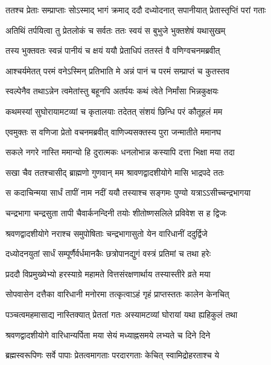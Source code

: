 \twolineshloka
{ततश्च प्रेताः सम्प्राप्ताः सोऽस्माद् भागं क्रमाद् ददौ}
{दध्योदनात् सपानीयात् प्रेतास्तृप्तिं परां गताः}%

\twolineshloka
{अतिथिं तर्पयित्वा तु प्रेतलोकं च सर्वतः}
{ततः स्वयं स बुभुजे भुक्तशेषं यथासुखम्}%

\twolineshloka
{तस्य भुक्तवतः स्वन्नं पानीयं च क्षयं ययौ}
{प्रेताधिपं ततस्तं वै वणिग्वचनमब्रवीत्}%

\twolineshloka
{आश्चर्यमेतत् परमं वनेऽस्मिन् प्रतिभाति मे}
{अन्नं पानं च परमं सम्प्राप्तं च कुतस्तव}%

\twolineshloka
{स्वल्पेनैव तथाऽन्नेन त्वमेतांस्तु बहूनपि}
{अतर्पयः कथं त्वेते निर्मांसा भिन्नकुक्षयः}%

\twolineshloka
{कथमस्यां सुघोरायामटव्यां च कृतालयाः}
{तदेतत् संशयं छिन्धि परं कौतूहलं मम}%

\twolineshloka
{एवमुक्तः स वणिजा प्रेतो वचनमब्रवीत्}
{वाणिज्यसक्तस्य पुरा जन्मातीते ममानघ}%

\twolineshloka
{सकले नगरे नास्ति ममान्यो हि दुरात्मकः}
{धनलोभान्न कस्यापि दत्ता भिक्षा मया तदा}%

\twolineshloka
{सखा चैव ततश्चासीद् ब्राह्मणो गुणवान् मम}
{श्रावणद्वादशीयोगे मासि भाद्रपदे ततः}%

\twolineshloka
{स कदाचिन्मया सार्धं तापीं नाम नदीं ययौ}
{तस्याश्च सङ्गमः पुण्यो यत्राऽऽसीच्चन्द्रभागया}%

\twolineshloka
{चन्द्रभागा चन्द्रसुता तापी चैवार्कनन्दिनी}
{तयोः शीतोष्णसलिले प्रविवेश स ह द्विजः}%

\twolineshloka
{श्रवणद्वादशीयोगे नराश्च समुपोषिताः}
{चन्द्रभागासुतो येन वारिधानीं ददुर्द्विजे}%

\twolineshloka
{दध्योदनयुतां सार्धं सम्पूर्णैर्वर्धमानकैः}
{छत्रोपानद्युगं वस्त्रं प्रतिमां च तथा हरेः}%

\twolineshloka
{प्रददौ विप्रमुख्येभ्यो हरस्याग्रे महामते}
{वित्तसंरक्षणार्थाय तस्यास्तीरे व्रते मया}%

\twolineshloka
{सोपवासेन दत्तैका वारिधानी मनोरमा}
{तत्कृत्वाऽहं गृहं प्राप्तस्ततः कालेन केनचित्}%

\twolineshloka
{पञ्चत्वमहमासाद्य नास्तिक्यात् प्रेततां गतः}
{अस्यामटव्यां घोरायां यथा ह्यहिकुलं तथा}%

\twolineshloka
{श्रवणद्वादशीयोगे वारिधान्यर्पिता मया}
{सेयं मध्याह्नसमये लभ्यते च दिने दिने}%

\twolineshloka
{ब्रह्मस्वरूपिणः सर्वे पापाः प्रेतत्वमागताः}
{परदारगताः केचित् स्वामिद्रोहरताश्च ये}%

